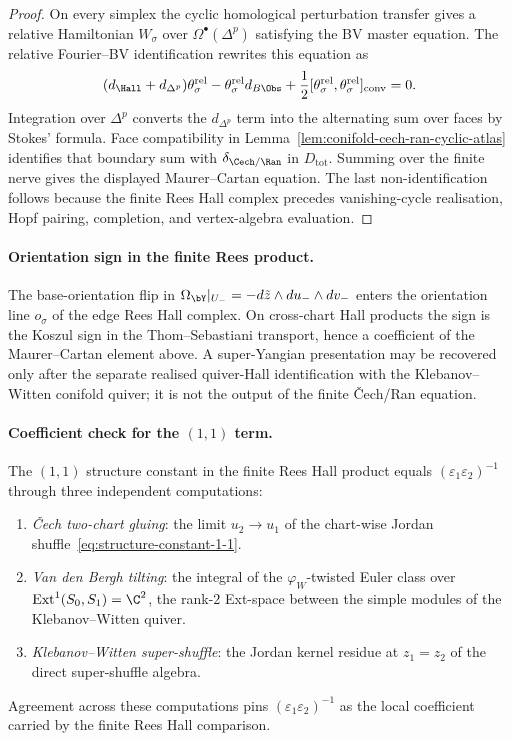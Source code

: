 \begin{proof}
On every simplex the cyclic homological perturbation transfer gives a
relative Hamiltonian $W_\sigma$ over $\Omega^\bullet(\Delta^p)$
satisfying the BV master equation. The relative Fourier--BV
identification rewrites this equation as
\[
 (d_{\Hall}+d_{\Delta^p})\theta_\sigma^{\mathrm{rel}}
 -\theta_\sigma^{\mathrm{rel}}d_{B\Obs}
 +\frac{1}{2}
 [\theta_\sigma^{\mathrm{rel}},\theta_\sigma^{\mathrm{rel}}]_{\mathrm{conv}}
 =0 .
\]
Integration over $\Delta^p$ converts the $d_{\Delta^p}$ term into the
alternating sum over faces by Stokes' formula. Face compatibility in
Lemma~\ref{lem:conifold-cech-ran-cyclic-atlas} identifies that boundary
sum with $\delta_{\Cech/\Ran}$ in $D_{\mathrm{tot}}$. Summing over the
finite nerve gives the displayed Maurer--Cartan equation. The last
non-identification follows because the finite Rees Hall complex precedes
vanishing-cycle realisation, Hopf pairing, completion, and vertex-algebra
evaluation.
\end{proof}

\paragraph{Orientation sign in the finite Rees product.}
The base-orientation flip in
$\Omega_{\bY}|_{U_-}=-d\tilde z\wedge du_-\wedge dv_-$ enters the
orientation line $o_\sigma$ of the edge Rees Hall complex. On cross-chart
Hall products the sign is the Koszul sign in the Thom--Sebastiani
transport, hence a coefficient of the Maurer--Cartan element above. A
super-Yangian presentation may be recovered only after the separate
realised quiver-Hall identification with the Klebanov--Witten conifold
quiver; it is not the output of the finite \v{C}ech/Ran equation.

\paragraph{Coefficient check for the $(1,1)$ term.}
The $(1,1)$ structure constant in the finite Rees Hall product equals
$(\varepsilon_1 \varepsilon_2)^{-1}$ through three independent
computations:
\begin{enumerate}[label=\emph{(\roman*)}, leftmargin=2em]
\item \emph{\v{C}ech two-chart gluing}: the limit $u_2 \to u_1$ of the
 chart-wise Jordan shuffle~\eqref{eq:structure-constant-1-1}.
\item \emph{Van den Bergh tilting}: the integral of the $\varphi_W$-twisted
 Euler class over $\mathrm{Ext}^1(S_0, S_1) = \C^2$, the rank-$2$
 Ext-space between the simple modules of the Klebanov--Witten quiver.
\item \emph{Klebanov--Witten super-shuffle}: the Jordan kernel residue at
 $z_1 = z_2$ of the direct super-shuffle algebra.
\end{enumerate}
Agreement across these computations pins $(\varepsilon_1 \varepsilon_2)^{-1}$
as the local coefficient carried by the finite Rees Hall comparison.

